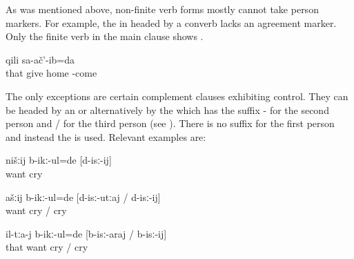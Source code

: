 As was mentioned above, non-finite verb forms mostly cannot take person markers. For example, the  in  headed by a converb lacks an agreement marker.  Only the finite verb in the main clause shows .
%
\begin{exe}
	\ex	\label{ex:(They) gave them (to me) and (I) went home@25}
		qili	sa-ač'-ib=da\\
		that	give	home	-come\\
	\glt	{}
\end{exe}

The only exceptions are certain complement clauses exhibiting control. They can be headed by an  or alternatively by the  which has the suffix - for the second person and \slash{} for the third person (see ). There is no suffix for the first person and instead the  is used. Relevant examples are:
%
\begin{exe}
	\ex	\label{ex:We wanted to cry@26}
	\begin{xlist}
		\ex	\label{ex:We wanted to cry@26a}
		\gll	nišːij	b-ikː-ul=de	[d-isː-ij]\\
				want	cry\\
		\glt	{}

		\ex	\label{ex:You wanted to cry@26b}
		\gll	ašːij	b-ikː-ul=de	[d-isː-utːaj	/	d-isː-ij]\\
				want	cry	/	cry\\
		\glt	{}

		\ex	\label{ex:They wanted to cry@27c}
		\gll	il-tːa-j	b-ikː-ul=de	[b-isː-araj	/	b-isː-ij]\\
			that		want	cry	/	cry\\
		\glt	{}
	\end{xlist}
\end{exe}
